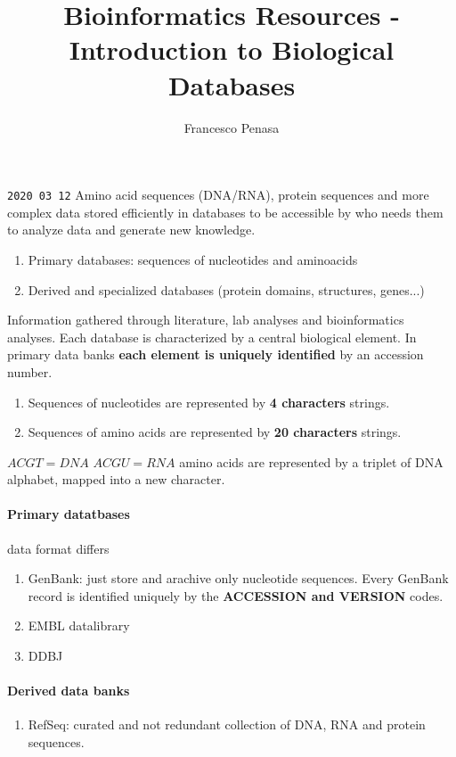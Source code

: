 \documentclass[11pt]{article}
\begin{document}
\author{Francesco Penasa}
\title{Bioinformatics Resources - Introduction to Biological Databases}
\maketitle

\medskip

\texttt{2020 03 12}
Amino acid sequences (DNA/RNA), protein sequences and more complex data stored efficiently in databases to be accessible by who needs them to analyze data and generate new knowledge.

\begin{enumerate}
	\item Primary databases: sequences of nucleotides and aminoacids
	\item Derived and specialized databases (protein domains, structures, genes...)
\end{enumerate}
Information gathered through literature, lab analyses and bioinformatics analyses.
Each database is characterized by a central biological element.
In primary data banks \textbf{each element is uniquely identified} by an accession number.

\begin{enumerate}
	\item Sequences of nucleotides are represented by \textbf{4 characters} strings.
	\item Sequences of amino acids are represented by \textbf{20 characters} strings.
\end{enumerate}
$ACGT = DNA$ $ACGU = RNA$ amino acids are represented by a triplet of DNA alphabet, mapped into a new character.

\paragraph{Primary datatbases} %
\label{par:primary_datatbases}
data format differs
\begin{enumerate}
	\item GenBank: just store and arachive only nucleotide sequences. Every GenBank record is identified uniquely by the \textbf{ACCESSION and VERSION} codes.
	\item EMBL datalibrary
	\item DDBJ
\end{enumerate}

\paragraph{Derived data banks} %
\label{par:derived_data_banks}
\begin{enumerate}
	\item RefSeq: curated and not redundant collection of DNA, RNA and protein sequences.
\end{enumerate}
\end{document}
